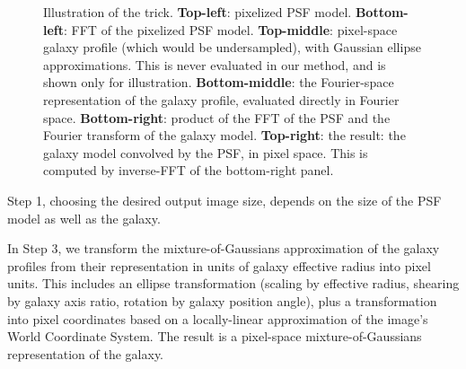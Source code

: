 \documentclass[11pt,preprint]{aastex}
\begin{document}
\begin{figure}
\begin{center}
\begin{tabular}{@{}c@{}c@{}c@{}}
    \end{tabular}
  \end{center}
  \caption{\label{fig:example}
    Illustration of the trick.
    \textbf{Top-left}: pixelized PSF model.
    \textbf{Bottom-left}: FFT of the pixelized PSF model.
    \textbf{Top-middle}: pixel-space galaxy profile (which would be
    undersampled), with Gaussian ellipse approximations.  This is
    never evaluated in our method, and is shown only for illustration.
    \textbf{Bottom-middle}: the Fourier-space representation of the
    galaxy profile, evaluated directly in Fourier space.
    \textbf{Bottom-right}: product of the FFT of the PSF and the
    Fourier transform of the galaxy model.
    \textbf{Top-right}: the result: the galaxy model convolved by the
    PSF, in pixel space.  This is computed by inverse-FFT of the
    bottom-right panel.
  }
\end{figure}

Step 1, choosing the desired output image size, depends on the size of
the PSF model as well as the galaxy.

In Step 3, we transform the mixture-of-Gaussians approximation of the
galaxy profiles from their representation in units of galaxy effective
radius into pixel units.  This includes an ellipse transformation
(scaling by effective radius, shearing by galaxy axis ratio, rotation
by galaxy position angle), plus a transformation into pixel
coordinates based on a locally-linear approximation of the image's
World Coordinate System.  
The result is a pixel-space mixture-of-Gaussians representation of the
galaxy.
\end{document}
